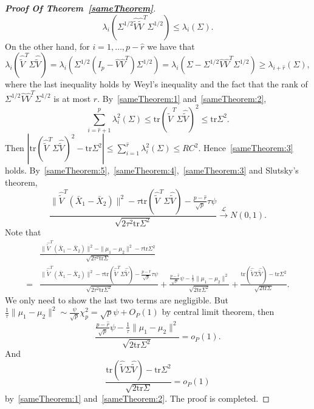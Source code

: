 \documentclass[review]{elsarticle}
\theoremstyle{plain}
\theoremstyle{definition}
\theoremstyle{remark}
\begin{document}
\begin{proof}[\textbf{Proof Of Theorem~\ref{sameTheorem}}]
\begin{equation}
    \lambda_i (\Sigma^{1/2} \hat{\tilde{V}}\hat{\tilde{V}}^T \Sigma^{1/2})
    \leq
    \lambda_i (\Sigma).
    \end{equation}
    On the other hand, for $i=1,\ldots,p-\hat{r}$ we have that
    \begin{equation}\label{sameTheorem:2}
    \lambda_i (\hat{\tilde{V}}^T \Sigma \hat{\tilde{V}})
    =
    \lambda_i (\Sigma^{1/2} (I_p-\hat{V}\hat{V}^T )\Sigma^{1/2})
    =
    \lambda_i (\Sigma-\Sigma^{1/2}\hat{V}\hat{V}^T\Sigma^{1/2})
    \geq
    \lambda_{i+\hat{r}} (\Sigma),
    \end{equation}
    where the last inequality holds by Weyl's inequality and the fact that the rank of $\Sigma^{1/2}\hat{V}\hat{V}^T\Sigma^{1/2}$ is at most $\hat{r}$.
    By~\eqref{sameTheorem:1} and~\eqref{sameTheorem:2},
$$
    \sum_{i=\hat{r}+1}^p \lambda_{i}^2(\Sigma)\leq \mathrm{tr}(\hat{\tilde{V}}^T\Sigma\hat{\tilde{V}})^2\leq \mathrm{tr}\Sigma^2.
    $$
    Then
    $
     |\mathrm{tr}(\hat{\tilde{V}}^T\Sigma\hat{\tilde{V}})^2- \mathrm{tr}\Sigma^2|\leq \sum_{i=1}^{\hat{r}} \lambda_{i}^2(\Sigma)\leq RC^2
    $.
    Hence~\eqref{sameTheorem:3} holds.
    By~\eqref{sameTheorem:5},~\eqref{sameTheorem:4},~\eqref{sameTheorem:3} and Slutsky's theorem, 
    \begin{equation*}
        \frac{\|\hat{\tilde{V}}^T(\bar{X}_1-\bar{X}_2)\|^2-\tau\mathrm{tr}(\hat{\tilde{V}}^T\Sigma\hat{\tilde{V}})-\frac{p-\hat{r}}{\sqrt{p}}\tau \psi }{\sqrt{2\tau^2\mathrm{tr}\Sigma^2}}\xrightarrow{\mathcal{L}}N(0,1).
    \end{equation*}
    Note that
    \begin{equation*}
        \begin{aligned}
            &\frac{\|\hat{\tilde{V}}^T(\bar{X}_1-\bar{X}_2)\|^2-\|\mu_1-\mu_2\|^2-\tau \mathrm{tr}\Sigma^2}{\sqrt{2\tau^2 \mathrm{tr}\Sigma}}\\
            =&
        \frac{\|\hat{\tilde{V}}^T(\bar{X}_1-\bar{X}_2)\|^2-\tau\mathrm{tr}(\hat{\tilde{V}}^T\Sigma\hat{\tilde{V}})-\frac{p-\hat{r}}{\sqrt{p}}\tau \psi }{\sqrt{2\tau^2\mathrm{tr}\Sigma^2}}
           + 
            \frac{\frac{p-\hat{r}}{\sqrt{p}}\psi-\frac{1}{\tau}\|\mu_1-\mu_2\|^2}{\sqrt{2\mathrm{tr}\Sigma^2}}
            +
            \frac{\mathrm{tr}(\hat{\tilde{V}}\Sigma\hat{\tilde{V}})-\mathrm{tr}\Sigma^2}{\sqrt{2\mathrm{tr}\Sigma}}.
        \end{aligned}
    \end{equation*}
We only need to show the last two terms are negligible.
But $\frac{1}{\tau}\|\mu_1-\mu_2\|^2\sim \frac{\psi}{\sqrt{p}}\chi^2_p=\sqrt{p}\psi+O_P(1)$ by central limit theorem, then
$$
            \frac{\frac{p-\hat{r}}{\sqrt{p}}\psi-\frac{1}{\tau}\|\mu_1-\mu_2\|^2}{\sqrt{2\mathrm{tr}\Sigma^2}}=o_P(1).
$$
And 
            $$
            \frac{\mathrm{tr}(\hat{\tilde{V}}\Sigma\hat{\tilde{V}})-\mathrm{tr}\Sigma^2}{\sqrt{2\mathrm{tr}\Sigma}}=o_P(1)
            $$
            by~\eqref{sameTheorem:1} and~\eqref{sameTheorem:2}. The proof is completed.




\end{proof}
\end{document}
